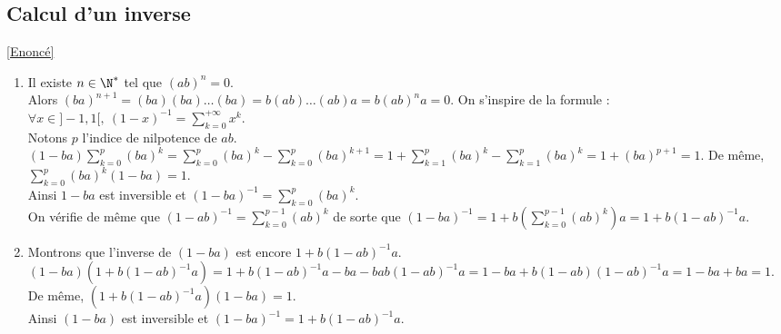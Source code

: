 \documentclass[8pt]{book}
\begin{document}
	\subsection{Calcul d'un inverse }
	\label{Calcul d'un inverse corrigé}
	\textcolor{blue}{\hyperref[Calcul d'un inverse]{[Enoncé]}}\\
	\begin{enumerate}[leftmargin=*]
		\item Il existe $n\in \N^*$ tel que $(ab)^n=0$.\\
		Alors $(ba)^{n+1}=(ba)(ba)\dots(ba)=b(ab)\dots(ab)a=b(ab)^na=0$. On s'inspire de la formule : $\forall x\in ]-1,1[,\ (1-x)^{-1}=\displaystyle\sum_{k=0}^{+\infty}x^k$.\\
		Notons $p$ l'indice de nilpotence de $ab$.\\
		$(1-ba)\displaystyle\sum_{k=0}^p(ba)^k=\sum_{k=0}^p(ba)^k-\sum_{k=0}^p(ba)^{k+1}=1+\sum_{k=1}^p(ba)^k-\sum_{k=1}^p(ba)^k=1+(ba)^{p+1}=1$. De même, $\displaystyle\sum_{k=0}^p(ba)^k(1-ba)=1$.\\
		Ainsi $1-ba$ est inversible et $(1-ba)^{-1}=\displaystyle\sum_{k=0}^p(ba)^k$.\\
		On vérifie de même que $(1-ab)^{-1}=\displaystyle\sum_{k=0}^{p-1}(ab)^k$ de sorte que $(1-ba)^{-1}=1+b\left(\displaystyle\sum_{k=0}^{p-1}(ab)^k\right)a=1+b(1-ab)^{-1}a$.
		\item Montrons que l'inverse de $(1-ba)$ est encore $1+b(1-ab)^{-1}a$.\\
		$(1-ba)(1+b(1-ab)^{-1}a)=1+b(1-ab)^{-1}a-ba-bab(1-ab)^{-1}a=1-ba+b(1-ab)(1-ab)^{-1}a=1-ba+ba=1$. De même, $(1+b(1-ab)^{-1}a)(1-ba)=1$.\\
		Ainsi $(1-ba)$ est inversible et $(1-ba)^{-1}=1+b(1-ab)^{-1}a$.
	\end{enumerate}
	
	
\end{document}

